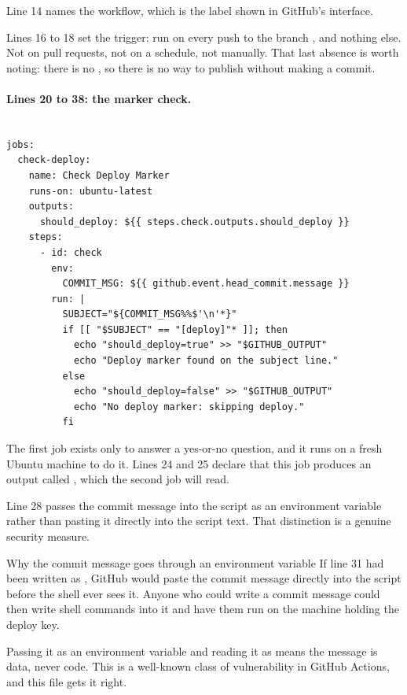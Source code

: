 Line 14 names the workflow, which is the label shown in GitHub's interface.

Lines 16 to 18 set the trigger: run on every push to the branch , and
nothing else. Not on pull requests, not on a schedule, not manually. That last
absence is worth noting: there is no , so there is no way
to publish without making a commit.

\paragraph{Lines 20 to 38: the marker check.}

\begin{lstlisting}[firstnumber=19,caption={\file{deploy.yml.disabled}, lines 19--38}]

jobs:
  check-deploy:
    name: Check Deploy Marker
    runs-on: ubuntu-latest
    outputs:
      should_deploy: ${{ steps.check.outputs.should_deploy }}
    steps:
      - id: check
        env:
          COMMIT_MSG: ${{ github.event.head_commit.message }}
        run: |
          SUBJECT="${COMMIT_MSG%%$'\n'*}"
          if [[ "$SUBJECT" == "[deploy]"* ]]; then
            echo "should_deploy=true" >> "$GITHUB_OUTPUT"
            echo "Deploy marker found on the subject line."
          else
            echo "should_deploy=false" >> "$GITHUB_OUTPUT"
            echo "No deploy marker: skipping deploy."
          fi
\end{lstlisting}

The first job exists only to answer a yes-or-no question, and it runs on a fresh
Ubuntu machine to do it. Lines 24 and 25 declare that this job produces an output
called , which the second job will read.

Line 28 passes the commit message into the script as an environment variable rather
than pasting it directly into the script text. That distinction is a genuine
security measure.

\begin{keyidea}{Why the commit message goes through an environment variable}
If line 31 had been written as , GitHub would paste the commit message directly into the script before the
shell ever sees it. Anyone who could write a commit message could then write shell
commands into it and have them run on the machine holding the deploy key.

Passing it as an environment variable and reading it as  means
the message is data, never code. This is a well-known class of vulnerability in
GitHub Actions, and this file gets it right.
\end{keyidea}

